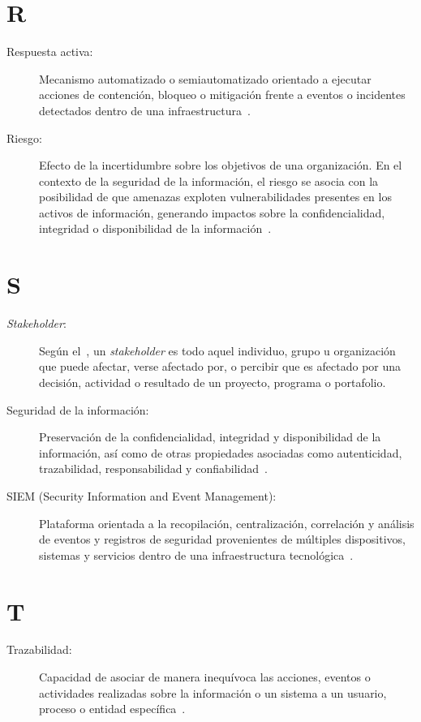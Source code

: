 \section*{R}
\begin{description}
	\item[Respuesta activa:] Mecanismo automatizado o semiautomatizado orientado a ejecutar acciones de contención, bloqueo o mitigación frente a eventos o incidentes detectados dentro de una infraestructura~\cite{WazuhActiveResponse}.
	
	\item[Riesgo:] Efecto de la incertidumbre sobre los objetivos de una organización. En el contexto de la seguridad de la información, el riesgo se asocia con la posibilidad de que amenazas exploten vulnerabilidades presentes en los activos de información, generando impactos sobre la confidencialidad, integridad o disponibilidad de la información~\cite{ISO27000Glossary}.
\end{description}

\section*{S}
\begin{description}
	\item[\textit{Stakeholder}:] Según el~\cite{PMI2019}, un \textit{stakeholder} es todo aquel individuo, grupo u organización que puede afectar, verse afectado por, o percibir que es afectado por una decisión, actividad o resultado de un proyecto, programa o portafolio.
	
	\item[Seguridad de la información:] Preservación de la confidencialidad, integridad y disponibilidad de la información, así como de otras propiedades asociadas como autenticidad, trazabilidad, responsabilidad y confiabilidad~\cite{ISO27000Glossary}.
	
	\item[SIEM (Security Information and Event Management):] Plataforma orientada a la recopilación, centralización, correlación y análisis de eventos y registros de seguridad provenientes de múltiples dispositivos, sistemas y servicios dentro de una infraestructura tecnológica~\cite{IBM_SIEM}.
\end{description}


\section*{T}
\begin{description}
	\item [Trazabilidad:] Capacidad de asociar de manera inequívoca las acciones, eventos o actividades realizadas sobre la información o un sistema a un usuario, proceso o entidad específica~\cite{ISO27000Glossary}.
\end{description}


